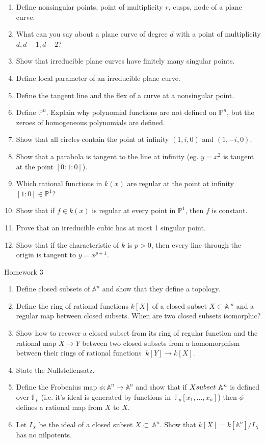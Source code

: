\documentclass[12pt]{amsart}
\begin{document}
\begin{enumerate}
\item Define nonsingular points, point of multiplicity $r$, cusps, node of a plane curve.
\item What can you say about a plane curve of degree $d$ with a point of multiplicity $d,d-1,d-2$?
\item Show that irreducible plane curves have finitely many singular points.
\item Define local parameter of an irreducible plane curve.
\item Define the tangent line and the flex of a curve at a nonsingular point.
\item Define $\mathbb P ^n$. Explain why polynomial functions are not defined on $\mathbb P ^n$, but the zeroes of homogeneous polynomials are defined.
\item Show that all circles contain the point at infinity $(1,i,0)$ and $(1,-i,0)$.
\item Show that a parabola is tangent to the line at infinity (eg. $y=x^2$ is tangent at the point $[0:1:0]$).
\item Which rational functions in $k(x)$ are regular at the point at infinity $[1:0]\in \mathbb P ^1$?
\item Show that if $f\in k(x)$ is regular at every point in $\mathbb P ^1$, then $f$ is constant.
\item Prove that an irreducible cubic has at most 1 singular point.
\item Show that if the characteristic of $k$ is $p>0$, then every line through the origin is tangent to $y=x^{p+1}$.

\end{enumerate}
\centerline{Homework 3}
\begin{enumerate}
\item Define closed subsets of $\mathbb A ^n$ and show that they define a topology.
\item Define the ring of rational functions $k[X]$ of a closed subset $X\subset \mathbb A \
^n$ and a regular map between closed subsets. When are two closed subsets isomorphic?
\item Show how to recover a closed subset from
its ring of regular function and the rational map $X\to Y$
between two closed subsets from a homomorphism between their rings of rational functions $\
k[Y]\to k[X]$.
\item State the Nullstellensatz.
\item Define the Frobenius map $\phi :\mathbb   A ^n\to \mathbb A ^n$ and show that if $X\\
subset\
 \mathbb A ^n$ is defined over $\mathbb F_p$ (i.e. it's ideal is generated by functions in\
 $\mathbb     F_p[x_1,\ldots,x_n ]$) then $\phi$ defines a rational map from $X$ to $X$.
\item Let $I_X$ be the ideal of a closed subset $X\subset\
 \mathbb A ^n$. Show that $k[X]=k[\mathbb A ^n]/I_X$ has no nilpotents.
\end{enumerate}
\end{document}
